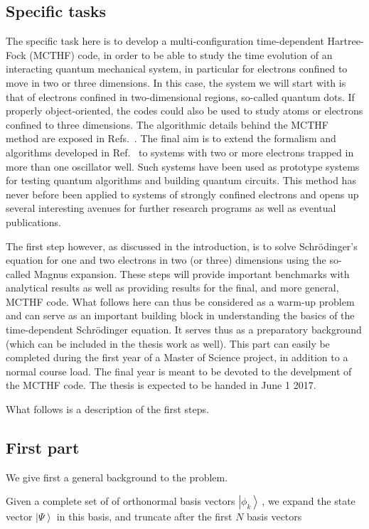 \documentclass[10pt]{revtex4}
\begin{document}
\subsection*{Specific tasks}
The specific task here is to develop a multi-configuration time-dependent Hartree-Fock (MCTHF) code, in order to be able to study the time evolution of an interacting quantum mechanical system, in particular for electrons confined to move in two or three dimensions. In this case, the system
we will start with is that of electrons confined in two-dimensional regions, so-called quantum dots.
If properly object-oriented, the codes could also be used to study atoms or electrons confined to
three dimensions. The algorithmic details behind the MCTHF method are exposed in Refs.~\cite{mcthf,sigve2013}.
The final aim is to extend the formalism and algorithms developed in Ref.~\cite{sigve2013} to systems with two or more electrons trapped in more than one oscillator well. Such systems have been used as prototype systems for testing quantum algorithms and building quantum circuits.
This method has never before been applied to systems of strongly confined electrons and opens up several interesting avenues for further research programs as well as eventual publications. 


The first step however, as discussed in the introduction, is to solve
Schr\"odinger's equation for one and two electrons in two (or three)
dimensions using the so-called Magnus expansion. These steps will
provide important benchmarks with analytical results as well as
providing results for the final, and more general, MCTHF code.  What
follows here can thus be considered as a warm-up problem and can serve
as an important building block in understanding the basics of the
time-dependent Schr\"odinger equation. It serves thus as a preparatory
background (which can be included in the thesis work as well).  This
part can easily be completed during the first year of a Master of
Science project, in addition to a normal course load. The final year
is meant to be devoted to the develpment of the MCTHF code.  The
thesis is expected to be handed in June 1 2017.

What follows is a description of the first steps.
\subsection*{First part}
We give first a general background to the problem. 

Given a complete set of of orthonormal basis vectors $\left| \phi_k \right\rangle\,$, we expand the state vector $\left|\Psi \right\rangle$ in this basis, and truncate after the first $N$ basis vectors
\end{document}
